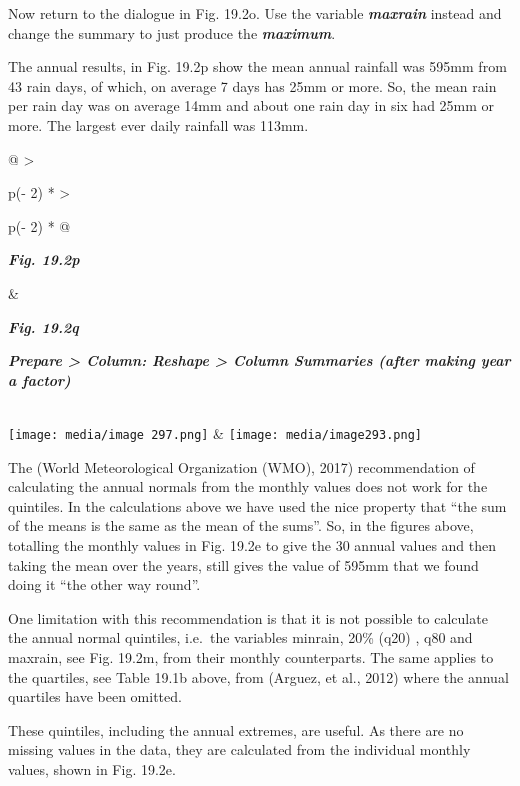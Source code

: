 \documentclass[
  letterpaper,
  DIV=11,
  numbers=noendperiod]{scrreprt}
\begin{document}
Now return to the dialogue in Fig. 19.2o. Use the variable
\textbf{\emph{maxrain}} instead and change the summary to just produce
the \textbf{\emph{maximum}}.

The annual results, in Fig. 19.2p show the mean annual rainfall was
595mm from 43 rain days, of which, on average 7 days has 25mm or more.
So, the mean rain per rain day was on average 14mm and about one rain
day in six had 25mm or more. The largest ever daily rainfall was 113mm.

\begin{longtable}[]{@{}
  >{\raggedright\arraybackslash}p{(\columnwidth - 2\tabcolsep) * }
  >{\raggedright\arraybackslash}p{(\columnwidth - 2\tabcolsep) * }@{}}
\toprule\noalign{}
\begin{minipage}[b]{\linewidth}\raggedright
\textbf{\emph{Fig. 19.2p}}
\end{minipage} & \begin{minipage}[b]{\linewidth}\raggedright
\textbf{\emph{Fig. 19.2q}}

\textbf{\emph{Prepare \textgreater{} Column: Reshape \textgreater{}
Column Summaries (after making year a factor)}}
\end{minipage} \\
\midrule\noalign{}
\endhead
\bottomrule\noalign{}
\endlastfoot
\texttt{[image: media/image 297.png]} &
\texttt{[image: media/image293.png]} \\
\end{longtable}

The (World Meteorological Organization (WMO), 2017) recommendation of
calculating the annual normals from the monthly values does not work for
the quintiles. In the calculations above we have used the nice property
that ``the sum of the means is the same as the mean of the sums''. So,
in the figures above, totalling the monthly values in Fig. 19.2e to give
the 30 annual values and then taking the mean over the years, still
gives the value of 595mm that we found doing it ``the other way round''.

One limitation with this recommendation is that it is not possible to
calculate the annual normal quintiles, i.e.~the variables minrain, 20\%
(q20) , q80 and maxrain, see Fig. 19.2m, from their monthly
counterparts. The same applies to the quartiles, see Table 19.1b above,
from (Arguez, et al., 2012) where the annual quartiles have been
omitted.

These quintiles, including the annual extremes, are useful. As there are
no missing values in the data, they are calculated from the individual
monthly values, shown in Fig. 19.2e.
\end{document}
